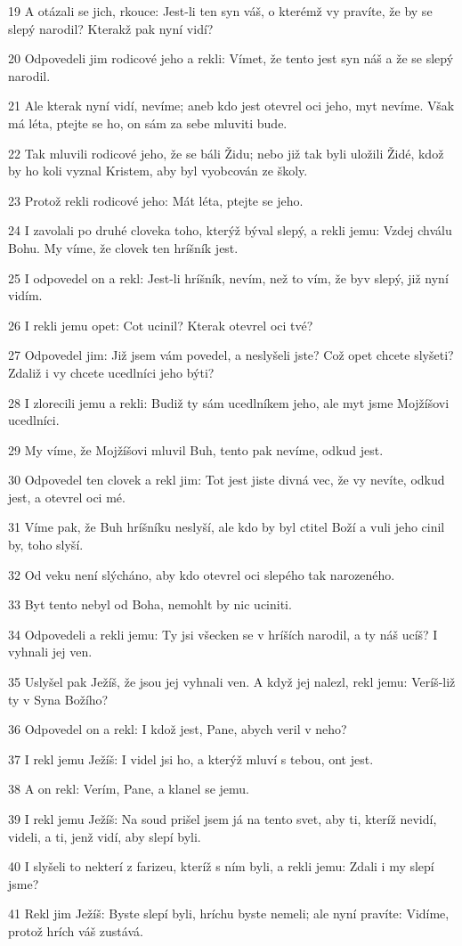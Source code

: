 \par 19 A otázali se jich, rkouce: Jest-li ten syn váš, o kterémž vy pravíte, že by se slepý narodil? Kterakž pak nyní vidí?
\par 20 Odpovedeli jim rodicové jeho a rekli: Vímet, že tento jest syn náš a že se slepý narodil.
\par 21 Ale kterak nyní vidí, nevíme; aneb kdo jest otevrel oci jeho, myt nevíme. Však má léta, ptejte se ho, on sám za sebe mluviti bude.
\par 22 Tak mluvili rodicové jeho, že se báli Židu; nebo již tak byli uložili Židé, kdož by ho koli vyznal Kristem, aby byl vyobcován ze školy.
\par 23 Protož rekli rodicové jeho: Mát léta, ptejte se jeho.
\par 24 I zavolali po druhé cloveka toho, kterýž býval slepý, a rekli jemu: Vzdej chválu Bohu. My víme, že clovek ten hríšník jest.
\par 25 I odpovedel on a rekl: Jest-li hríšník, nevím, než to vím, že byv slepý, již nyní vidím.
\par 26 I rekli jemu opet: Cot ucinil? Kterak otevrel oci tvé?
\par 27 Odpovedel jim: Již jsem vám povedel, a neslyšeli jste? Což opet chcete slyšeti? Zdaliž i vy chcete ucedlníci jeho býti?
\par 28 I zlorecili jemu a rekli: Budiž ty sám ucedlníkem jeho, ale myt jsme Mojžíšovi ucedlníci.
\par 29 My víme, že Mojžíšovi mluvil Buh, tento pak nevíme, odkud jest.
\par 30 Odpovedel ten clovek a rekl jim: Tot jest jiste divná vec, že vy nevíte, odkud jest, a otevrel oci mé.
\par 31 Víme pak, že Buh hríšníku neslyší, ale kdo by byl ctitel Boží a vuli jeho cinil by, toho slyší.
\par 32 Od veku není slýcháno, aby kdo otevrel oci slepého tak narozeného.
\par 33 Byt tento nebyl od Boha, nemohlt by nic uciniti.
\par 34 Odpovedeli a rekli jemu: Ty jsi všecken se v hríších narodil, a ty náš ucíš? I vyhnali jej ven.
\par 35 Uslyšel pak Ježíš, že jsou jej vyhnali ven. A když jej nalezl, rekl jemu: Veríš-liž ty v Syna Božího?
\par 36 Odpovedel on a rekl: I kdož jest, Pane, abych veril v neho?
\par 37 I rekl jemu Ježíš: I videl jsi ho, a kterýž mluví s tebou, ont jest.
\par 38 A on rekl: Verím, Pane, a klanel se jemu.
\par 39 I rekl jemu Ježíš: Na soud prišel jsem já na tento svet, aby ti, kteríž nevidí, videli, a ti, jenž vidí, aby slepí byli.
\par 40 I slyšeli to nekterí z farizeu, kteríž s ním byli, a rekli jemu: Zdali i my slepí jsme?
\par 41 Rekl jim Ježíš: Byste slepí byli, hríchu byste nemeli; ale nyní pravíte: Vidíme, protož hrích váš zustává.

